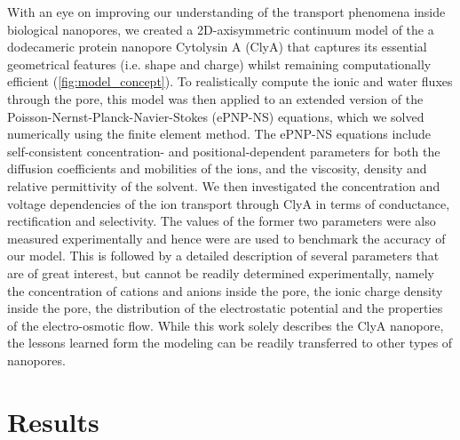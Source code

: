 \documentclass[journal=ancac3,manuscript=article,etalmode=truncate,maxauthors=0,layout=twocolumn]{achemso}
\begin{document}
With an eye on improving our understanding of the transport phenomena inside biological nanopores, we created 
a 2D-axisymmetric continuum model of the a dodecameric protein nanopore Cytolysin A (ClyA)\cite{Soskine-2013} 
that captures its essential geometrical features (i.e. shape and charge) whilst remaining computationally 
efficient (\cref{fig:model_concept}). To realistically compute the ionic and water fluxes through the pore, 
this model was then applied to an extended version of the Poisson-Nernst-Planck-Navier-Stokes (ePNP-NS) 
equations, which we solved numerically using the finite element method. The ePNP-NS equations include 
self-consistent concentration- and positional-dependent parameters for both the diffusion coefficients and 
mobilities of the ions, and the viscosity, density and relative permittivity of the solvent. We then 
investigated the concentration and voltage dependencies of the ion transport through ClyA in terms of 
conductance, rectification and selectivity. The values of the former two parameters were also measured 
experimentally and hence were are used to benchmark the accuracy of our model. This is followed by a detailed 
description of several parameters that are of great interest, but cannot be readily determined 
experimentally, namely the concentration of cations and anions inside the pore, the ionic charge density 
inside the pore, the distribution of the electrostatic potential and the properties of the electro-osmotic 
flow. While this work solely describes the ClyA nanopore, the lessons learned form the modeling can be 
readily transferred to other types of nanopores.



\section{Results}\label{sect:results}
\end{document}
